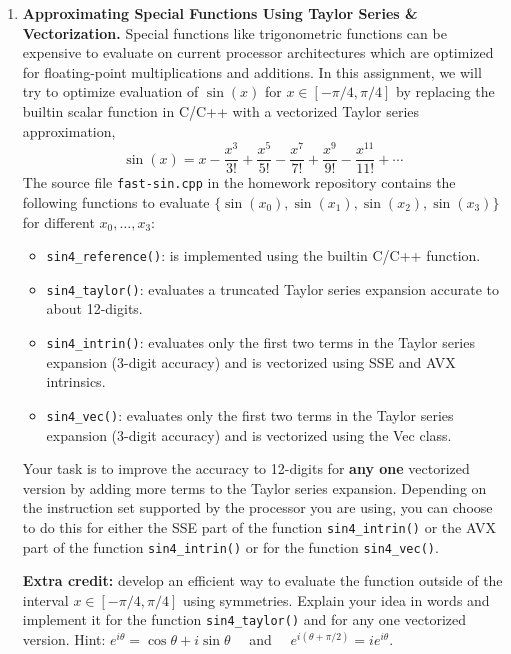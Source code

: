\documentclass[12pt]{article}
\begin{document}
\begin{enumerate}
  \item {\bf Approximating Special Functions Using Taylor Series \& Vectorization.}
    Special functions like trigonometric functions can be expensive to
    evaluate on current processor architectures which are optimized for
    floating-point multiplications and additions. In this assignment, we
    will try to optimize evaluation of $\sin(x)$ for $x\in[-\pi/4,
    \pi/4]$ by replacing the builtin scalar function in C/C++ with a
    vectorized Taylor series approximation,
    \[
      \sin(x) = x - \frac{x^3}{3!} + \frac{x^5}{5!} - \frac{x^7}{7!} + \frac{x^9}{9!} - \frac{x^{11}}{11!} + \cdots
    \]
    The source file \texttt{fast-sin.cpp} in the homework repository
    contains the following functions to evaluate $\{\sin(x_0),
    \sin(x_1), \sin(x_2), \sin(x_3)\}$ for different $x_0,\ldots,x_3$:
    \begin{itemize}
      \item \texttt{sin4\_reference()}: is implemented using the builtin C/C++ function.
      \item \texttt{sin4\_taylor()}: evaluates a truncated Taylor series expansion accurate to about 12-digits.
      \item \texttt{sin4\_intrin()}: evaluates only the first two
        terms in the Taylor series expansion (3-digit accuracy) and
        is vectorized using SSE and AVX intrinsics.
      \item \texttt{sin4\_vec()}: evaluates only the first two terms
        in the Taylor series expansion (3-digit accuracy) and
        is vectorized using the Vec class.
    \end{itemize}
    Your task is to improve the accuracy to 12-digits for {\bf any one}
    vectorized version by adding more terms to the Taylor series
    expansion.  Depending on the instruction set supported by the
    processor you are using, you can choose to do this for either the
    SSE part of the function \texttt{sin4\_intrin()} or the AVX part of
    the function \texttt{sin4\_intrin()} or for the function
    \texttt{sin4\_vec()}.

    {\bf Extra credit:} develop an efficient way to evaluate the
    function outside of the interval $x\in[-\pi/4,\pi/4]$ using
    symmetries.  Explain
    your idea in words and implement it for the function
    \texttt{sin4\_taylor()} and for any one vectorized version.
    Hint: $e^{i \theta} = \cos \theta + i \sin \theta$
    ~~and~~ $e^{i(\theta+\pi/2)} = i e^{i \theta}$.
    

\end{enumerate}
\end{document}
